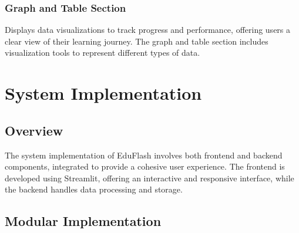 \documentclass{report}
\begin{document}
\subsection{Graph and Table Section}
Displays data visualizations to track progress and performance, offering users a clear view of their learning journey. The graph and table section includes visualization tools to represent different types of data.

\chapter{System Implementation}
\section{Overview}
The system implementation of EduFlash involves both frontend and backend components, integrated to provide a cohesive user experience. The frontend is developed using Streamlit, offering an interactive and responsive interface, while the backend handles data processing and storage.

\section{Modular Implementation}

\end{document}
